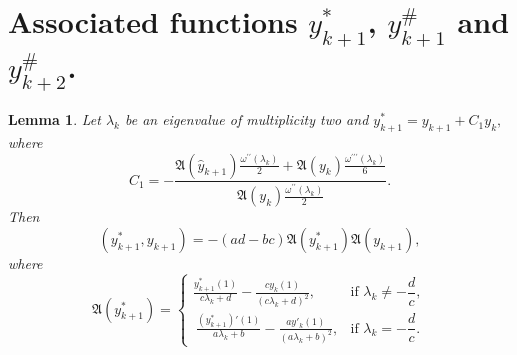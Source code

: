 \documentclass[10pt,a4paper]{amsart}
\newtheorem{lem}[thm]{Lemma}
\numberwithin{equation}{section}
\begin{document}
\section{Associated functions $y_{k+1}^*$, $y_{k+1}^\#$ and $y_{k+2}^\#$.} 
\begin{lem}
Let $\lambda_k$ be an eigenvalue of multiplicity two and
\(
y_{k+1}^* = y_{k+1} + C_1 y_k,
\)
where
\begin{equation}
    C_1=-\frac{\mathfrak{A}(\hat{y}_{k+1})\frac{\omega^{\prime\prime}(\lambda_k)}{2}+\mathfrak{A}(y_k)\frac{\omega^{\prime\prime\prime}(\lambda_k)}{6}}{\mathfrak{A}(y_k)\frac{\omega^{\prime\prime}(\lambda_k)}{2}}. \label{(5.1)}
\end{equation}
Then 
\begin{equation}
(y_{k+1}^*, y_{k+1}) =-(ad-bc)\mathfrak{A}(y_{k+1}^*)\mathfrak{A}(y_{k+1}), \label{(5.2)}
\end{equation}
where 
\begin{equation}
 \mathfrak{A}(y^{*}_{k+1}) =
\begin{cases}
\displaystyle  
\frac{y^{*}_{k + 1}(1)}{c\lambda_{k}+d} - \frac{cy_{k}(1)}{{(c\lambda_{k}+d)}^{2}}, 
& \text{if } \lambda_k \neq -\dfrac{d}{c}, \\[10pt]
\displaystyle \ 
\frac{(y^{*}_{k + 1})'(1)}{a\lambda_{k}+b} - \frac{ay'_{k}(1)}{{(a\lambda_{k}+b)}^{2}}, 
&  \text{if } \lambda_k = -\dfrac{d}{c}.
\end{cases} \label{(5.2.1)}
\end{equation}
\end{lem}
\end{document}
